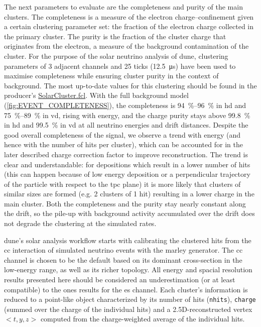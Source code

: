 The next parameters to evaluate are the completeness and purity of the main clusters. The completeness is a measure of the electron charge--confinement given a certain clustering parameter set: the fraction of the electron charge collected in the primary cluster. The purity is the fraction of the cluster charge that originates from the electron, a measure of the background contamination of the cluster. For the purpose of the solar neutrino analysis of \gls{dune}, clustering parameters of 3 adjacent channels and 25 ticks (\SI{12.5}{\micro\second}) have been used to maximise completeness while ensuring cluster purity in the context of background. The most up-to-date values for this clustering should be found in the producer's \href{https://github.com/DUNE/dunereco/blob/develop/dunereco/LowEUtils/fcl/SolarCluster.fcl}{SolarCluster.fcl}. With the full background model (\cref{fig:EVENT_COMPLETENESS}), the completeness is \SIrange{94}{96}{\percent} in \gls{hd} and \SIrange{75}{89}{\percent} in \gls{vd}, rising with energy, and the charge purity stays above \SI{99.8}{\percent} in \gls{hd} and \SI{99.5}{\percent} in \gls{vd} at all neutrino energies and drift distances. Despite the good overall completeness of the signal, we observe a trend with energy (and hence with the number of hits per cluster), which can be accounted for in the later described charge correction factor to improve reconstruction. The trend is clear and understandable: for depositions which result in a lower number of hits (this can happen because of low energy deposition or a perpendicular trajectory of the particle with respect to the \gls{tpc} plane) it is more likely that clusters of similar sizes are formed (e.g. 2 clusters of 1 hit) resulting in a lower charge in the main cluster. Both the completeness and the purity stay nearly constant along the drift, so the pile-up with background activity accumulated over the drift does not degrade the clustering at the simulated rates.

\gls{dune}'s solar analysis workflow starts with calibrating the clustered hits from the \gls{cc} interaction of simulated neutrino events with the \gls{marley} generator. The \gls{cc} channel is chosen to be the default based on its dominant cross-section in the low-energy range, as well as its richer topology. All energy and spacial resolution results presented here should be considered an underestimation (or at least compatible) to the ones results for the \gls{es} channel. Each cluster's information is reduced to a point-like object characterized by its number of hits (\texttt{nhits}), \texttt{charge} (summed over the charge of the individual hits) and a 2.5D-reconstructed vertex $<t, y, z>$ computed from the charge-weighted average of the individual hits.

